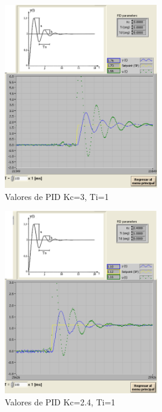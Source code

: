\documentclass[]{article}
\begin{document}
\begin{figure}[h!]
	\centering
	\includegraphics[width=0.6\textwidth]{Imagenes/signalActividad6prueba1}
	\caption{Valores de PID Kc=3, Ti=1}
	\label{fig:signalActividad6prueba1}
\end{figure}

\begin{figure}[h!]
	\centering
	\includegraphics[width=0.6\textwidth]{Imagenes/signalActividad6prueba2}
	\caption{Valores de PID Kc=2.4, Ti=1}
	\label{fig:signalActividad6prueba2}
\end{figure}
\end{document}
